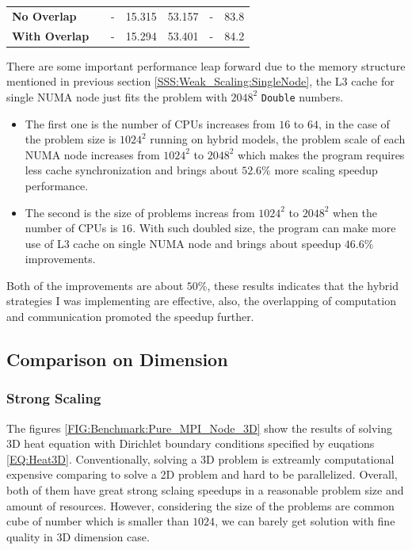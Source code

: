 \begin{table}
\begin{minipage}{\columnwidth}
\begin{center}
\begin{tabular}{>{\bfseries}p{3cm} p{1.5cm} p{1.5cm} p{1.5cm} p{1.5cm} p{1.5cm} p{1cm}}
        No Overlap    &                               &   -    & 15.315  & 53.157   &   -                                        & 83.8 \\
        With Overlap  &                               &   -    & 15.294  & 53.401   &   -                                        & 84.2 \\
        \bottomrule
      \end{tabular}
    \end{center}
  \end{minipage}
\end{table}

There are some important performance leap forward 
due to the memory structure mentioned in previous section \ref{SSS:Weak_Scaling:SingleNode}, the L3 cache for single NUMA node 
just fits the problem with $2048^2$ \texttt{Double} numbers.
\begin{itemize}
  \item The first one is the number of CPUs increases from $16$ to $64$, in the case of the problem size is $1024^2$ running on hybrid models, 
  the problem scale of each NUMA node increases from $1024^2$ to $2048^2$ which makes the program requires less cache synchronization 
  and brings about $52.6\%$ more scaling speedup performance.
  \item The second is the size of problems increas from $1024^2$ to $2048^2$ when the number of CPUs is $16$.
  With such doubled size, the program can make more use of L3 cache on single NUMA node and brings about speedup $46.6\%$ improvements. 
\end{itemize}
Both of the improvements are about $50\%$, these results indicates that the hybrid strategies I was implementing are effective, 
also, the overlapping of computation and communication promoted the 
speedup further.

\subsection{Comparison on Dimension}
\subsubsection{Strong Scaling}
The figures \ref{FIG:Benchmark:Pure_MPI_Node_3D} show the results of solving 3D heat equation with Dirichlet boundary conditions 
specified by euqations \ref{EQ:Heat3D}.
Conventionally, solving a 3D problem is extreamly computational expensive comparing to solve a 2D problem and hard to be parallelized.
Overall, both of them have great strong sclaing speedups in a reasonable problem size and amount of resources.
However, considering the size of the problems are common cube of number which is smaller than $1024$, 
we can barely get solution with fine quality in 3D dimension case.

